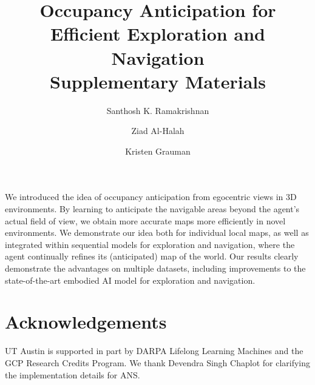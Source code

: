 \documentclass[runningheads]{llncs}
\begin{document}
We introduced the idea of occupancy anticipation from egocentric views in 3D environments.  By learning to anticipate the navigable areas beyond the agent's actual field of view, we obtain more accurate maps more efficiently in novel environments.  We demonstrate our idea both for individual local maps, as well as integrated within sequential models for exploration and navigation, where the agent continually refines its (anticipated) map of the world.  Our results clearly demonstrate the advantages on multiple datasets, including improvements to the state-of-the-art embodied AI model for exploration and navigation.

\section*{Acknowledgements}

UT Austin is supported in part by DARPA Lifelong Learning Machines and the GCP Research Credits Program. We thank Devendra Singh Chaplot for clarifying the implementation details for ANS. 



\vfill
\pagebreak

\title{Occupancy Anticipation for Efficient Exploration and Navigation \\ Supplementary Materials}

\author{Santhosh K. Ramakrishnan \and
Ziad Al-Halah \and
Kristen Grauman}




\newpage
\clearpage
\maketitle
\setcounter{section}{0}
\setcounter{figure}{0}
\setcounter{table}{0}
\renewcommand{\thesection}{S\arabic{section}}
\renewcommand{\thetable}{S\arabic{table}}
\renewcommand{\thefigure}{S\arabic{figure}}
\end{document}
